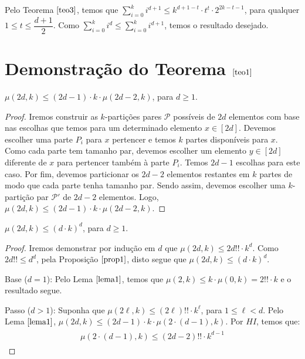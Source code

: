 \documentclass[12pt]{article}
\begin{document}
{Pelo Teorema $\ref{teo3}$, temos que $ \sum\limits_{i = 0}^{ k }i^{d+1}   \leq k^{d+1-t} {\cdot} t^t  {\cdot} 2^{2k-t-1} $, para qualquer $1 \leq t \leq \dfrac{d+1}{2}$. Como $ \sum\limits_{i = 0}^{ k }i^{d} \leq  \sum\limits_{i = 0}^{ k }i^{d+1}$, temos o resultado desejado.

 \newpage
 
 \section{Demonstração do Teorema $\ref{teo1}$} \newl
 
 \begin{lema}  
 	\label{lema1} 
 	$\mu(2d, k) \leq (2d - 1) \cdot k \cdot \mu(2d - 2, k)$, para $d \geq 1$.
 \end{lema}
 
 \begin{proof} Iremos construir as $k$-partições pares $\mathcal{P}$ possíveis de $2d$ elementos com base nas escolhas que temos para um determinado elemento $x \in [2d]$. Devemos escolher uma parte $P_i$ para $x$ pertencer e temos $k$ partes disponíveis para $x$. Como cada parte tem tamanho par, devemos escolher um elemento $y \in [2d]$ diferente de $x$ para pertencer também à parte $P_i$. Temos $2d - 1$ escolhas para este caso. Por fim, devemos particionar os $2d - 2$ elementos restantes em $k$ partes de modo que cada parte tenha tamanho par. Sendo assim, devemos escolher uma $k$-partição par $\mathcal{P'}$ de $2d - 2$ elementos. Logo, $\mu(2d, k) \leq (2d - 1) \cdot k \cdot \mu(2d - 2, k)$. 
 	
 \end{proof} \newl
 
 
  \begin{lema}  
 	\label{lema2} 
 	$\mu(2d, k) \leq (d {\cdot} k)^d$, para $d \geq 1$.
 \end{lema}
 
 \begin{proof} Iremos demonstrar por indução em $d$ que $\mu(2d, k) \leq 2d!! \cdot k^d$. Como $2d!! \leq d^d$, pela Proposição $\ref{prop1}$, disto segue que $\mu(2d, k) \leq (d {\cdot} k)^d$. 
 	
 	Base ($d = 1$): Pelo Lema $\ref{lema1}$, temos que $\mu(2, k) \leq k \cdot \mu(0, k)= 2!! \cdot k$ e o resultado segue.
 	
 	Passo ($d > 1$): Suponha que $\mu(2\ell, k) \leq (2\ell)!! \cdot k^{\ell}$, para $1 \leq \ell < d$. Pelo Lema $\ref{lema1}$, $\mu(2d, k) \leq (2d - 1) \cdot k \cdot \mu(2 {\cdot} (d - 1), k)$. Por $HI$, temos que: 
 	\begin{align}
 		\begin{split}
			\mu(2 {\cdot} (d - 1), k) \leq (2d - 2)!! \cdot k^{d-1}
 		\end{split} 
 	\end{align} 
 	

\end{proof}}
\end{document}
